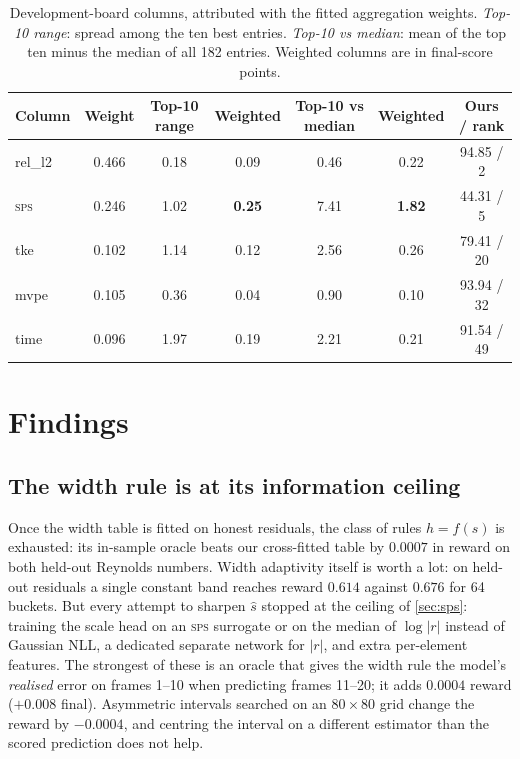 \documentclass[10pt]{article}
\newcommand{\sps}{\textsc{sps}}
\newcommand{\shat}{\hat{s}}
\begin{document}
\begin{table}[t]
\centering
\caption{Development-board columns, attributed with the fitted aggregation weights. \emph{Top-10 range}: spread among the ten best entries. \emph{Top-10 vs median}: mean of the top ten minus the median of all 182 entries. Weighted columns are in final-score points.}
\label{tab:spread}
\small
\begin{tabular}{lcccccc}
\toprule
Column & Weight & Top-10 range & Weighted & Top-10 vs median & Weighted & Ours / rank\\
\midrule
rel\_l2 & 0.466 & 0.18 & 0.09 & 0.46 & 0.22 & 94.85 / 2\\
\sps{} & 0.246 & 1.02 & \textbf{0.25} & 7.41 & \textbf{1.82} & 44.31 / 5\\
tke & 0.102 & 1.14 & 0.12 & 2.56 & 0.26 & 79.41 / 20\\
mvpe & 0.105 & 0.36 & 0.04 & 0.90 & 0.10 & 93.94 / 32\\
time & 0.096 & 1.97 & 0.19 & 2.21 & 0.21 & 91.54 / 49\\
\bottomrule
\end{tabular}
\end{table}

\section{Findings}
\label{sec:findings}

\subsection{The width rule is at its information ceiling}

Once the width table is fitted on honest residuals, the class of rules $h=f(\shat)$ is exhausted: its in-sample oracle beats our cross-fitted table by $0.0007$ in reward on both held-out Reynolds numbers. Width adaptivity itself is worth a lot: on held-out residuals a single constant band reaches reward $0.614$ against $0.676$ for 64 buckets. But every attempt to sharpen $\shat$ stopped at the ceiling of \cref{sec:sps}: training the scale head on an \sps{} surrogate or on the median of $\log|r|$ instead of Gaussian NLL, a dedicated separate network for $|r|$, and extra per-element features. The strongest of these is an oracle that gives the width rule the model's \emph{realised} error on frames 1--10 when predicting frames 11--20; it adds $0.0004$ reward ($+0.008$ final). Asymmetric intervals searched on an $80\times80$ grid change the reward by $-0.0004$, and centring the interval on a different estimator than the scored prediction does not help.
\end{document}
